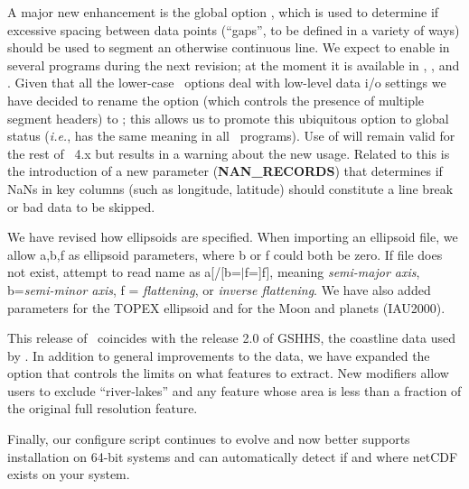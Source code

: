 A major new enhancement is the global option , which is used to determine if excessive spacing
between data points (``gaps'', to be defined in a variety of ways) should be used to segment an otherwise continuous
line.  We expect to enable  in several programs during the next revision; at the moment it is
available in , ,  and .
Given that all the lower-case \gmt\ options deal with low-level data i/o settings we have decided
to rename the  option (which controls the presence of multiple segment headers) to ; this
allows us to promote this ubiquitous option to global status (\emph{i.e.}, has the same meaning in all \gmt\ programs).
Use of  will remain valid for the rest of \gmt\ 4.x but results in a warning about the new usage.
Related to this is the introduction of a new parameter ({\bf NAN\_RECORDS}) that determines if NaNs in
key columns (such as longitude, latitude) should constitute a line break or bad data to be skipped.

We have revised how ellipsoids are specified.  When importing an ellipsoid file, we allow a,b,f as ellipsoid parameters,
where b or f could both be zero.  If file does not exist, attempt to read name as a[/[b=$|$f=]f],
meaning {\it semi-major axis}, b={\it semi-minor axis}, f = {\it flattening}, or {\it inverse flattening}.  We have also
added parameters for the TOPEX ellipsoid and for the Moon and planets (IAU2000).

This release of \GMT\ coincides with the release 2.0 of GSHHS, the coastline data used by \GMT.  In addition to
general improvements to the data, we have expanded the  option that controls the limits on what features
to extract.  New modifiers allow users to exclude ``river-lakes'' and any feature whose area is less than a
fraction of the original full resolution feature.

Finally, our configure script continues to evolve and now better supports installation on 64-bit systems and
can automatically detect if and where netCDF exists on your system.

